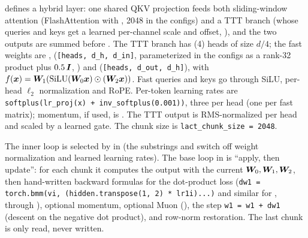 \begin{implnote}[title={In the code: the LaCT language-model layer}]
 defines a hybrid layer: one shared QKV
projection feeds both sliding-window attention (FlashAttention with , 2048 in
the configs) and a TTT branch (whose queries and keys get a learned per-channel scale and
offset, ), and the two outputs are summed before . The TTT
branch has  (4) heads of size $d/4$; the fast weights are ,
 (\texttt{[heads, d\_h, d\_in]}, parameterized in the configs as a rank-32 product plus $0.5\,\bm{I}$,
) and 
(\texttt{[heads, d\_out, d\_h]}), with $f(\bm{x}) = \bm{W}_1(\operatorname{SiLU}(\bm{W}_0\bm{x})\odot(\bm{W}_2\bm{x}))$. Fast queries
and keys go through SiLU, per-head $\ell_2$ normalization and RoPE. Per-token learning rates are
\texttt{softplus(lr\_proj(x) + inv\_softplus(0.001))}, three per head (one per fast matrix);
momentum, if used, is . The TTT output is RMS-normalized per head
and scaled by a learned gate. The chunk size is \texttt{lact\_chunk\_size = 2048}.

The inner loop is selected by  in 
(the substrings  and  switch off weight normalization and learned
learning rates). The base loop in  is ``apply, then update'': for each chunk it
computes the output with the current $\bm{W}_0,\bm{W}_1,\bm{W}_2$, then hand-written backward formulas
for the dot-product loss (\texttt{dw1 = torch.bmm(vi, (hidden.transpose(1, 2) * lr1i)...)} and
similar for ,  through ), optional momentum, optional
Muon (), the step \texttt{w1 = w1 + dw1} (descent on the
negative dot product), and row-norm restoration. The last chunk is only read, never written.
\end{implnote}

